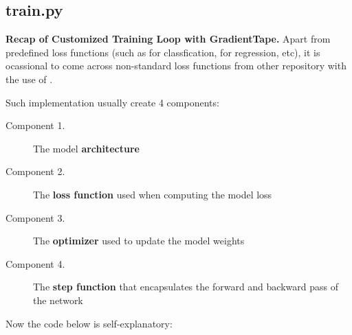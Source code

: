 \documentclass[10pt,a4paper]{article}
\begin{document}
\subsection{train.py}
\textbf{Recap of Customized Training Loop with GradientTape.} Apart from predefined loss functions (such as  for classfication,  for regression, etc), it is ocassional to come across non-standard loss functions from other repository with the use of . 

Such implementation usually create 4 components:

\begin{description}
    \item[\sffamily Component 1.] The model \textbf{architecture}
    \item[\sffamily Component 2.] The \textbf{loss function} used when computing the model loss
    \item[\sffamily Component 3.]  The \textbf{optimizer} used to update the model weights
    \item[\sffamily Component 4.] The \textbf{step function} that encapsulates the forward and backward pass of the network
\end{description}

Now the code below is self-explanatory:
\end{document}

